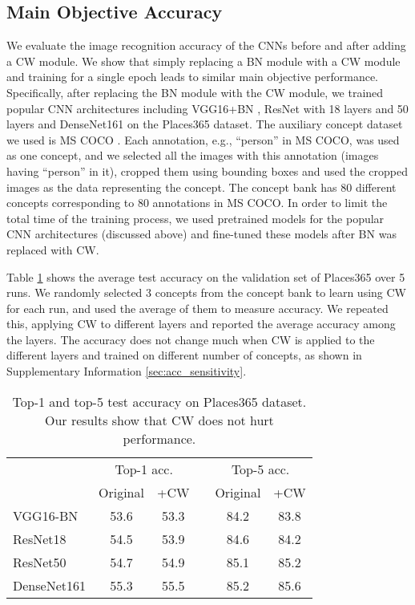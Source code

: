 \documentclass{article}
\begin{document}
\subsection{Main Objective Accuracy}
\label{sec:acc}
We evaluate the image recognition accuracy of the CNNs before and after adding a CW module. We show that simply replacing a BN module with a CW module and training for a single epoch leads to similar main objective performance. Specifically, after replacing the BN module with the CW module, we trained popular CNN architectures including VGG16+BN \cite{simonyan2014very}, ResNet with 18 layers and 50 layers \cite{he2016deep} and DenseNet161 \cite{huang2017densely} on the Places365  \cite{zhou2017places} dataset.  The auxiliary concept dataset we used is MS COCO \cite{lin2014microsoft}. Each annotation, e.g., ``person'' in MS COCO, was used as one concept, and we selected all the images with this annotation (images having ``person'' in it), cropped them using bounding boxes and used the cropped images as the data representing the concept. The concept bank has 80 different concepts corresponding to 80 annotations in MS COCO. In order to limit the total time of the training process, we used pretrained models for the popular CNN architectures (discussed above) and fine-tuned these models after BN was replaced with CW. 

Table \ref{fig:acc_places} shows the average test accuracy on the validation set of Places365 over 5 runs. We randomly selected 3 concepts from the concept bank to learn using CW for each run, and used the average of them to measure accuracy. We repeated this, applying CW to different layers and reported the average accuracy among the layers. The accuracy does not change much when CW is applied to the different layers and trained on different number of concepts, as shown in Supplementary Information \ref{sec:acc_sensitivity}.  
\begin{table}[htbp]
    \centering
    \begin{tabular}{lcc c cc}
     \hline
     & \multicolumn{2}{c}{Top-1 acc.} && \multicolumn{2}{c}{Top-5 acc.} \\
     \cline{2-3} \cline{5-6}
     & Original & +CW && Original & +CW \\ 
     \hline
     VGG16-BN & 53.6 & 53.3 && 84.2 & 83.8\\ 
     ResNet18 & 54.5 & 53.9 && 84.6 & 84.2\\ 
     ResNet50 & 54.7 & 54.9 && 85.1 &  85.2\\ 
     DenseNet161 & 55.3 & 55.5 && 85.2 &  85.6\\ 
     \hline
    \end{tabular}
    \caption{Top-1 and top-5 test accuracy on Places365 dataset. Our results show that CW does not hurt performance.}
    \label{fig:acc_places}
\end{table}
\end{document}
